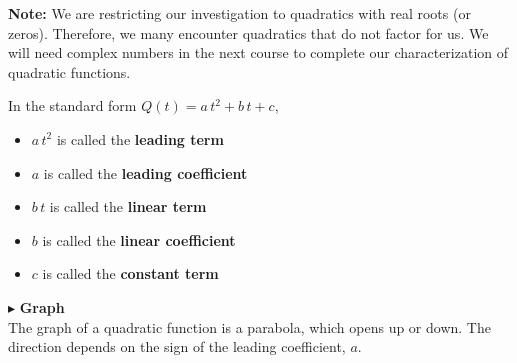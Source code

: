 \documentclass{ximera}
\begin{document}
\textbf{Note:} We are restricting our investigation to quadratics with real roots (or zeros).  Therefore, we many encounter quadratics that do not factor for us.  We will need complex numbers in the next course to complete our characterization of quadratic functions.




\begin{notation} 

In the standard form $Q(t) = a \, t^2 + b \, t + c  $,


\begin{itemize}
\item $a \, t^2$ is called the \textbf{leading term}
\item $a$ is called the \textbf{leading coefficient}
\item $b \, t$ is called the \textbf{linear term}
\item $b$ is called the \textbf{linear coefficient}
\item $c$ is called the \textbf{constant term}
\end{itemize}





\end{notation}





$\blacktriangleright$ \textbf{\textcolor{red!10!blue!90!}{Graph}} \\ 

The graph of a quadratic function is a parabola, which opens up or down.  The direction depends on the sign of the leading coefficient, $a$.
\end{document}
